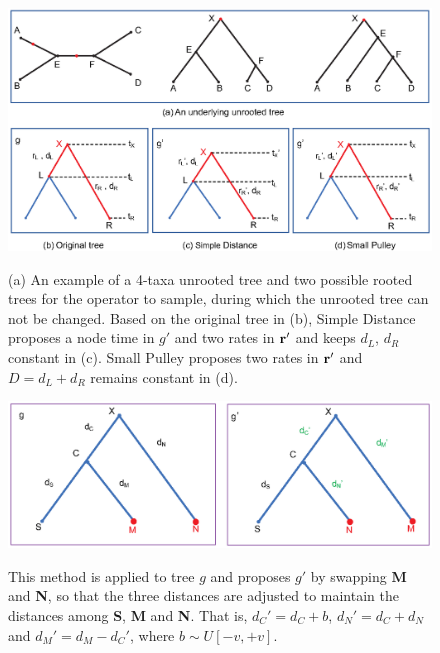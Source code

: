 \documentclass{bmcart}
\begin{document}
\begin{backmatter}
\begin{figure}[h!]
\includegraphics[width=12cm]{Fig03-rootstrategy.eps}\\
\caption{
             (a) An example of a 4-taxa unrooted tree and two possible rooted trees for the operator to sample, during which the unrooted tree can not be changed. Based on the original tree in (b), Simple Distance proposes a node time in ${g}'$ and two rates in $\bf{r}'$ and keeps $d_L$, $d_R$ constant in (c). Small Pulley proposes two rates in $\bf{r}'$ and $D = {d_L} + {d_R}$ remains constant in (d).}
\label{simpledistance}
\end{figure}


\begin{figure}[h!]
\includegraphics[width=12cm]{Fig04-exchangemethod.eps}\\
\caption{
             This method is applied to tree $g$ and proposes $g'$ by swapping \textbf{M} and \textbf{N}, so that the three distances are adjusted to maintain the distances among \textbf{S}, \textbf{M} and \textbf{N}. That is, ${d_C}' = {d_C} + b$, ${d_N}' = d_C + d_N$ and ${d_M}' = d_{M} - {d_C}'$, where $b \sim U[ - v, + v]$.}
\label{exchangemethod}
\end{figure}


\end{backmatter}
\end{document}
